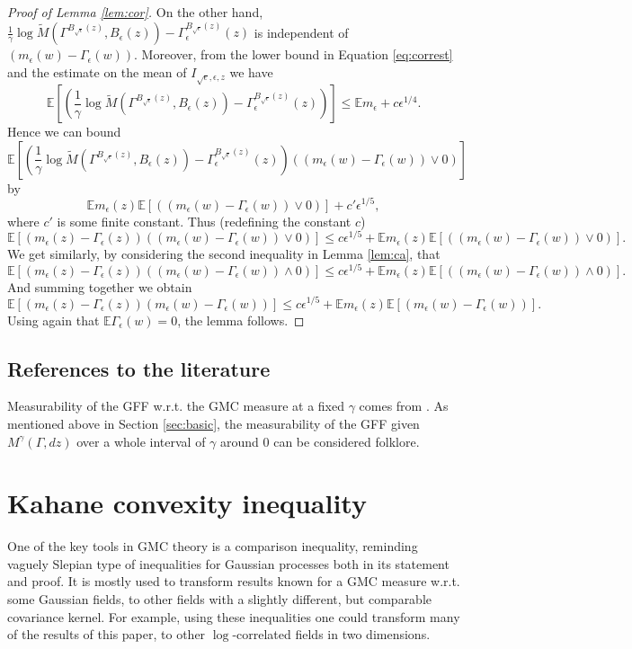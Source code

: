 \documentclass[11pt]{amsart}
\newcommand{\E}{\mathbb E}
\renewcommand{\1}{\mathbf 1}
\newcommand{\eps}{\epsilon}
\begin{document}
\begin{proof}[Proof of Lemma \ref{lem:cor}]
On the other hand, $\frac{1}{\gamma}\log \tilde M(\Gamma^{B_{\sqrt{\eps}}(z)},B_\eps(z)) - \Gamma_\eps^{B_{\sqrt{\eps}}(z)}(z)$ is independent of $(m_\eps(w)-\Gamma_\eps(w))$. Moreover, from the lower bound in Equation \eqref{eq:correst} and the estimate on the mean of $I_{\sqrt{\eps},\eps,z}$ we have
$$\E\left[(\frac{1}{\gamma}\log \tilde M(\Gamma^{B_{\sqrt{\eps}}(z)},B_\eps(z)) - \Gamma_\eps^{B_{\sqrt{\eps}}(z)}(z))\right] \leq \E m_\eps + c\eps^{1/4}.$$
Hence we can bound
$$\E\left[(\frac{1}{\gamma}\log \tilde M(\Gamma^{B_{\sqrt{\eps}}(z)},B_\eps(z)) - \Gamma_\eps^{B_{\sqrt{\eps}}(z)}(z))\left((m_\eps(w)-\Gamma_\eps(w))\vee 0\right)\right]$$
by
$$\E m_\eps(z)\E\left[\left((m_\eps(w)-\Gamma_\eps(w))\vee 0\right)\right]+c'\eps^{1/5},$$
where $c'$ is some finite constant. Thus (redefining the constant $c$)
$$\E\left[(m_\eps(z)-\Gamma_\eps(z))\left((m_\eps(w)-\Gamma_\eps(w))\vee 0\right)\right] \leq c\eps^{1/5} + \E m_\eps(z)\E\left[\left((m_\eps(w)-\Gamma_\eps(w))\vee 0\right)\right].$$
We get similarly, by considering the second inequality in Lemma \ref{lem:ca}, that
$$\E\left[(m_\eps(z)-\Gamma_\eps(z))\left((m_\eps(w)-\Gamma_\eps(w))\wedge 0\right)\right] \leq c\eps^{1/5} + \E m_\eps(z)\E\left[\left((m_\eps(w)-\Gamma_\eps(w))\wedge 0\right)\right].$$
And summing together we obtain
$$\E\left[(m_\eps(z)-\Gamma_\eps(z))(m_\eps(w)-\Gamma_\eps(w))\right] \leq c\eps^{1/5} + \E m_\eps(z)\E\left[(m_\eps(w)-\Gamma_\eps(w))\right].$$
Using again that $\E\Gamma_\eps(w) = 0$, the lemma follows. 
\end{proof}

\subsection*{References to the literature}

Measurability of the GFF w.r.t. the GMC measure at a fixed $\gamma$ comes from \cite{BerSheSun}. As mentioned above in Section \ref{sec:basic}, the measurability of the GFF given $M^\gamma(\Gamma,dz)$ over a whole interval of $\gamma$ around $0$ can be considered folklore. 

\section{Kahane convexity inequality}\label{sec:Kah}

One of the key tools in GMC theory is a comparison inequality, reminding vaguely Slepian type of inequalities for Gaussian processes both in its statement and proof. It is mostly used to transform results known for a GMC measure w.r.t. some Gaussian fields, to other fields with a slightly different, but comparable covariance kernel. For example, using these inequalities one could transform many of the results of this paper, to other $\log$-correlated fields in two dimensions. %
\end{document}
